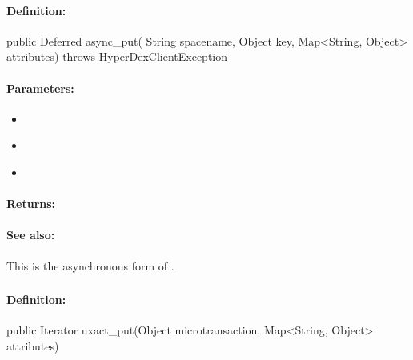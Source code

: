 \paragraph{Definition:}
\begin{javacode}
public Deferred async_put(
        String spacename,
        Object key,
        Map<String, Object> attributes) throws HyperDexClientException
\end{javacode}

\paragraph{Parameters:}
\begin{itemize}[noitemsep]
\item {}\\

\item {}\\

\item {}\\

\end{itemize}

\paragraph{Returns:}


\paragraph{See also:}  This is the asynchronous form of .

\pagebreak
\subsubsection{}
\label{api:java:uxact_put}


\paragraph{Definition:}
\begin{javacode}
public Iterator uxact_put(Object microtransaction, Map<String, Object> attributes)
\end{javacode}

